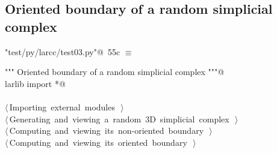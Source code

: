 \documentclass[11pt,oneside]{article}    %
\begin{document}
\subsection{Oriented boundary of a random simplicial complex}


\begin{flushleft} \small
\begin{minipage}{\linewidth} \label{scrap99}
\protect{}\verb@"test/py/larcc/test03.py"@\nobreak\ {\footnotesize 55c }$\equiv$
\vspace{-1ex}
\begin{list}{}{} \item
\mbox{}\verb@""" Oriented boundary of a random simplicial complex """@\\
\mbox{}\verb@from larlib import *@\\
\mbox{}\verb@@\\
\mbox{}\verb@@\hbox{$\langle\,$Importing external modules\nobreak\ {\footnotesize {}}$\,\rangle$}\verb@@\\
\mbox{}\verb@@\hbox{$\langle\,$Generating and viewing a random 3D simplicial complex\nobreak\ {\footnotesize {}}$\,\rangle$}\verb@@\\
\mbox{}\verb@@\hbox{$\langle\,$Computing and viewing its non-oriented boundary\nobreak\ {\footnotesize {}}$\,\rangle$}\verb@@\\
\mbox{}\verb@@\hbox{$\langle\,$Computing and viewing its oriented boundary\nobreak\ {\footnotesize {}}$\,\rangle$}\verb@@\\
\mbox{}\verb@@{\NWsep}
\end{list}
\vspace{-2ex}
\end{minipage}\\[4ex]
\end{flushleft}
\end{document}
